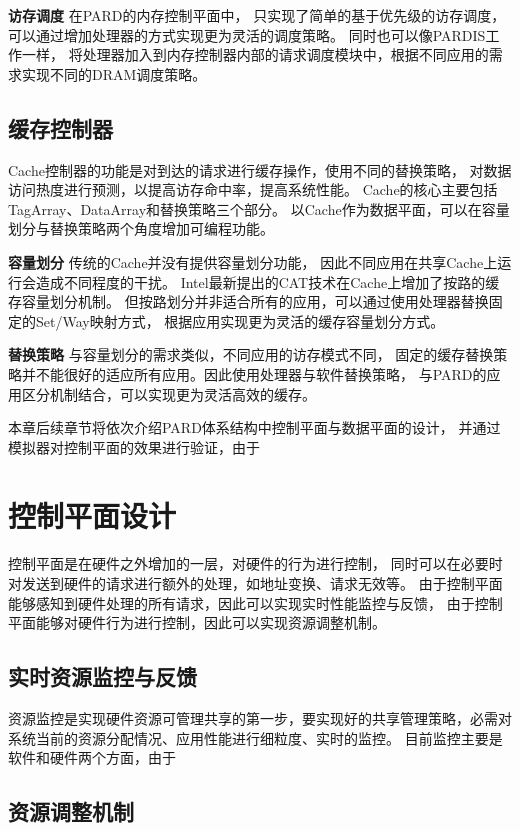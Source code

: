 \textbf{访存调度}\quad
在PARD的内存控制平面中，
只实现了简单的基于优先级的访存调度，可以通过增加处理器的方式实现更为灵活的调度策略。
同时也可以像PARDIS\cite{bojnordi_pardis:_2012}工作一样，
将处理器加入到内存控制器内部的请求调度模块中，根据不同应用的需求实现不同的DRAM调度策略。

\subsection{缓存控制器}
Cache控制器的功能是对到达的请求进行缓存操作，使用不同的替换策略，
对数据访问热度进行预测，以提高访存命中率，提高系统性能。
Cache的核心主要包括TagArray、DataArray和替换策略三个部分。
以Cache作为数据平面，可以在容量划分与替换策略两个角度增加可编程功能。

\textbf{容量划分}\quad
传统的Cache并没有提供容量划分功能，
因此不同应用在共享Cache上运行会造成不同程度的干扰。
Intel最新提出的CAT技术\cite{intel-cat}在Cache上增加了按路的缓存容量划分机制。
但按路划分并非适合所有的应用，可以通过使用处理器替换固定的Set/Way映射方式，
根据应用实现更为灵活的缓存容量划分方式。

\textbf{替换策略}\quad
与容量划分的需求类似，不同应用的访存模式不同，
固定的缓存替换策略并不能很好的适应所有应用。因此使用处理器与软件替换策略，
与PARD的应用区分机制结合，可以实现更为灵活高效的缓存。

本章后续章节将依次介绍PARD体系结构中控制平面与数据平面的设计，
并通过模拟器对控制平面的效果进行验证，由于

\section{控制平面设计}

控制平面是在硬件之外增加的一层，对硬件的行为进行控制，
同时可以在必要时对发送到硬件的请求进行额外的处理，如地址变换、请求无效等。
由于控制平面能够感知到硬件处理的所有请求，因此可以实现实时性能监控与反馈，
由于控制平面能够对硬件行为进行控制，因此可以实现资源调整机制。

\subsection{实时资源监控与反馈}
资源监控是实现硬件资源可管理共享的第一步，要实现好的共享管理策略，必需对系统当前的资源分配情况、应用性能进行细粒度、实时的监控。
目前监控主要是软件和硬件两个方面，由于


\subsection{资源调整机制}

